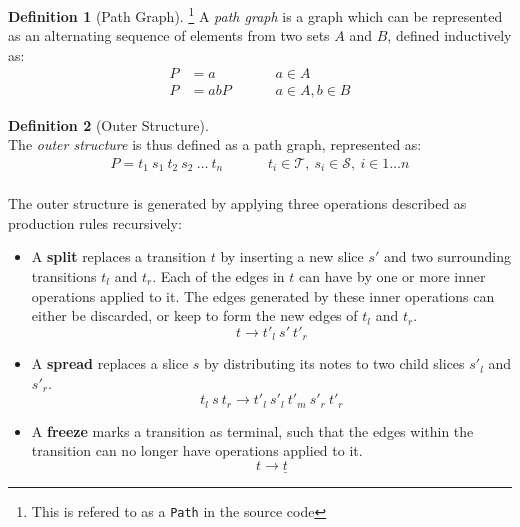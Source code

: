 \documentclass[12pt,a4paper,twoside,openright]{report}
\theoremstyle{definition}
\newtheorem{definition}{Definition}[section]
\begin{document}
\begin{definition}[Path Graph] \footnote{This is refered to as a \texttt{Path} in the source code} A \textit{path graph} is a graph which can be represented as an alternating sequence of elements from two sets $A$ and $B$, defined inductively as:
  \begin{equation}
    \begin{align}
      P &= a     &&&& a \in A \\
      P &= abP   &&&& a \in A, b \in B 
    \end{align}
    \label{eq:pathGraph}
  \end{equation}
  \label{def:pathGraph}
\end{definition}

\begin{definition}[Outer Structure] ~\\The \textit{outer structure} is thus defined as a path graph, represented as:
\begin{equation}
    \begin{align}
      P = t_1~s_1~t_2~s_2~\dots~t_n     &&&& t_i \in \mathcal{T},~s_i \in \mathcal{S},~ i \in 1\dots n \\
    \end{align}
  \label{eq:outerStructureDef}
\end{equation}
\end{definition}

The outer structure is generated by applying three operations described as production rules recursively:

\begin{itemize}
  \item A \textbf{split} replaces a transition $t$ by inserting a new slice $s'$ and two surrounding transitions $t_l$ and $t_r$. Each of the edges in $t$ can have by one or more inner operations applied to it. The edges generated by these inner operations can either be discarded, or keep to form the new edges of $t_l$ and $t_r$.
\begin{equation}
  t \to t'_l~s'~t'_r
  \label{eq:splitrule}
\end{equation}
  \item A \textbf{spread} replaces a slice $s$ by distributing its notes to two child slices $s'_l$ and $s'_r$. 
\begin{equation}
  t_l~s~t_r \to t'_l~s'_l~t'_m~s'_r~t'_r
  \label{eq:spreadrule}
\end{equation}
\item A \textbf{freeze} marks a transition as terminal, such that the edges within the transition can no longer have operations applied to it. 
\begin{equation}
  t \to \underline{t}
  \label{eq:freezerule}
\end{equation}
\end{itemize}
\end{document}
